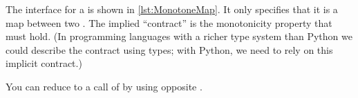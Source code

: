
The interface for a  is shown in \cref{lst:MonotoneMap}.
It only specifies that it is a map between two .
The implied ``contract'' is the monotonicity property that must hold.
(In programming languages with a richer type system than Python we could describe the contract using types; with Python, we need to rely on this implicit contract.)



\begin{widepar}
\end{widepar}

\begin{hint}
    You can reduce  to a call of  by using opposite .
\end{hint}
